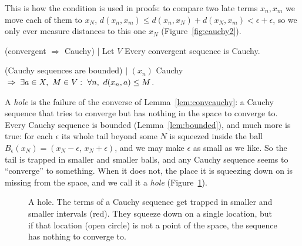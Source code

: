 This is how the condition is used in proofs: to compare two late terms
$x_n,x_m$ we move each of them to $x_N$,
$d(x_n,x_m)\le d(x_n,x_N)+d(x_N,x_m)<\epsilon+\epsilon$, so we only ever
measure distances to this one $x_N$ (Figure~\ref{fig:cauchy2}).

\begin{lemma} (convergent $\Rightarrow$ Cauchy) $\mid$ \label{lem:convcauchy}
Let $V$ Every convergent sequence is Cauchy.
\end{lemma}

\begin{lemma} (Cauchy sequences are bounded) $\mid$ \label{lem:bounded}
$(x_n)$ Cauchy $\;\Rightarrow\; \exists a\in X,\ M\in V:\ \forall n,\ d(x_n,a)\le M$.
\end{lemma}

A \emph{hole} is the failure of the converse of Lemma~\ref{lem:convcauchy}:
a Cauchy sequence that tries to converge but has nothing in the space to
converge to. Every Cauchy sequence is bounded (Lemma~\ref{lem:bounded}), and
much more is true: for each $\epsilon$ its whole tail beyond some $N$ is
squeezed inside the ball $B_\epsilon(x_N)=(x_N-\epsilon,\,x_N+\epsilon)$, and
we may make $\epsilon$ as small as we like. So the tail is trapped in smaller
and smaller balls, and any Cauchy sequence seems to ``converge'' to something.
When it does not, the place it is squeezing down on is missing from the
space, and we call it a \emph{hole} (Figure~\ref{fig:hole}).

\begin{figure}[ht]
\centering
{}
\caption{A hole. The terms of a Cauchy sequence get trapped in smaller and
smaller intervals (red). They squeeze down on a single location, but if that
location (open circle) is not a point of the space, the sequence has nothing
to converge to.}
\label{fig:hole}
\end{figure}

